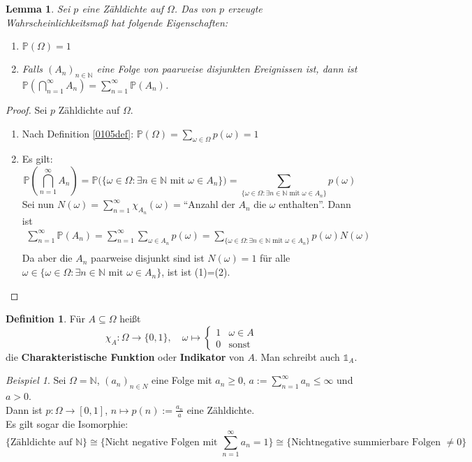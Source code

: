 \documentclass[10pt,a4paper]{article}
\newcommand{\N}{\ensuremath{\mathbb{N}}}
\newcommand{\Prb}{\mathbb P}
\theoremstyle{plain}
\newtheorem{lem}[theorem]{Lemma}
\theoremstyle{definition}
\newtheorem{definition}[theorem]{Definition}
\theoremstyle{remark}
\newtheorem{exm}[theorem]{Beispiel}
\begin{document}
	\begin{lem}
		Sei $p$ eine Zähldichte auf $\Omega$. Das von $p$ erzeugte Wahrscheinlichkeitsmaß hat folgende Eigenschaften:
		\begin{enumerate}
			\item $\Prb(\Omega)=1$
			\item Falls $(A_n)_{n\in\N}$ eine Folge von paarweise disjunkten Ereignissen ist, dann ist $\Prb(\bigcap_{n=1}^\infty A_n)=\sum_{n=1}^{\infty}\Prb(A_n)$.
		\end{enumerate}
	\end{lem}
	\begin{proof}
		Sei $p$ Zähldichte auf $\Omega$.
		\begin{enumerate}
			\item Nach Definition \ref{0105def}: $\Prb(\Omega)=\sum_{\omega\in\Omega}p(\omega)=1$
			\item Es gilt:
			\[\tag{1}
			\Prb\left(\bigcap_{n=1}^\infty A_n\right)=\Prb\big(\{\omega\in\Omega:\text{$\exists n\in\N$ mit $\omega\in A_n$}\}\big)
			=\sum_{\{\omega\in\Omega:\text{$\exists n\in\N$ mit $\omega\in A_n$}\}} p(\omega)
			\]
			Sei nun $N(\omega)=\sum_{n=1}^{\infty}\chi_{A_n}(\omega)=$\enquote{Anzahl der $A_n$ die  $\omega$ enthalten}. Dann ist 
			\begin{align*}
			\sum_{n=1}^\infty\Prb(A_n)=\sum_{n=1}^\infty\sum_{\omega\in A_n}	\tag{2} p(\omega)=\sum_{\{\omega\in\Omega:\text{$\exists n\in\N$ mit $\omega\in A_n$}\}}p(\omega)N(\omega)\\
			\end{align*}
			Da aber die $A_n$ paarweise disjunkt sind ist $N(\omega)=1$ für alle $\omega\in{\{\omega\in\Omega:\text{$\exists n\in\N$ mit $\omega\in A_n$}\}}$, ist ist (1)=(2).\qedhere
		\end{enumerate}
	\end{proof}

	\begin{definition}
		Für $A\subseteq\Omega$ heißt 
		\[\chi_A:\Omega\to\{0,1\},\quad \omega\mapsto\begin{cases}
		1&\omega\in A\\0&\text{sonst}
		\end{cases}\]
		die \textbf{Charakteristische Funktion} oder \textbf{Indikator} von $A$. Man schreibt auch $\mathds{1}_A$.
	\end{definition}
	
	\begin{exm}
		Sei $\Omega=\N$, $(a_n)_{n\in N}$ eine Folge mit $a_n\ge 0$, $a:=\sum_{n=1}^\infty a_n\le \infty$ und $a>0$.\\
		Dann ist $p:\Omega\to[0,1]$, $n\mapsto p(n):=\frac{a_n}{a}$ eine Zähldichte.\\
		Es gilt sogar die Isomorphie: 
		\[\{\text{Zähldichte auf $\N$}\}\cong \{\text{Nicht negative Folgen mit $\sum_{n=1}^{\infty}a_n=1$}\}\cong\{\text{Nichtnegative summierbare Folgen $\neq 0$}\}\]
	\end{exm}
	
\end{document}
